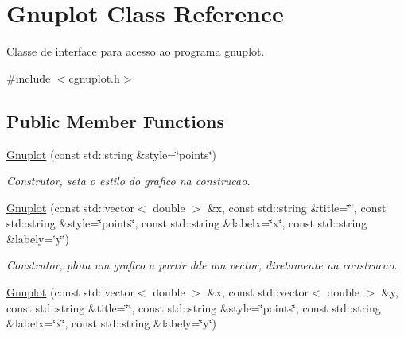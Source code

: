 \hypertarget{classGnuplot}{\section{Gnuplot Class Reference}
\label{classGnuplot}
}


Classe de interface para acesso ao programa gnuplot.  




{\ttfamily \#include $<$cgnuplot.\-h$>$}

\subsection*{Public Member Functions}
\begin{DoxyCompactItemize}
\item 
\hypertarget{classGnuplot_a187eb517b362cf379492fe7f1621ee50}{\hyperlink{classGnuplot_a187eb517b362cf379492fe7f1621ee50}{Gnuplot} (const std\-::string \&style=\char`\"{}points\char`\"{})}\label{classGnuplot_a187eb517b362cf379492fe7f1621ee50}

\begin{DoxyCompactList}\small\item\em Construtor, seta o estilo do grafico na construcao. \end{DoxyCompactList}\item 
\hypertarget{classGnuplot_a8ceac5808e42665c1dee305ae7ea9070}{\hyperlink{classGnuplot_a8ceac5808e42665c1dee305ae7ea9070}{Gnuplot} (const std\-::vector$<$ double $>$ \&x, const std\-::string \&title=\char`\"{}\char`\"{}, const std\-::string \&style=\char`\"{}points\char`\"{}, const std\-::string \&labelx=\char`\"{}x\char`\"{}, const std\-::string \&labely=\char`\"{}y\char`\"{})}\label{classGnuplot_a8ceac5808e42665c1dee305ae7ea9070}

\begin{DoxyCompactList}\small\item\em Construtor, plota um grafico a partir dde um vector, diretamente na construcao. \end{DoxyCompactList}\item 
\hypertarget{classGnuplot_a24327b6116c71acdc195eadf665c67cb}{\hyperlink{classGnuplot_a24327b6116c71acdc195eadf665c67cb}{Gnuplot} (const std\-::vector$<$ double $>$ \&x, const std\-::vector$<$ double $>$ \&y, const std\-::string \&title=\char`\"{}\char`\"{}, const std\-::string \&style=\char`\"{}points\char`\"{}, const std\-::string \&labelx=\char`\"{}x\char`\"{}, const std\-::string \&labely=\char`\"{}y\char`\"{})}\label{classGnuplot_a24327b6116c71acdc195eadf665c67cb}


\end{DoxyCompactItemize}

